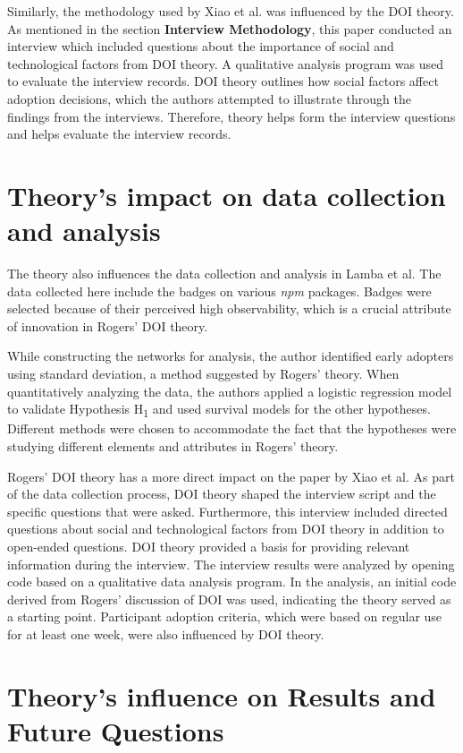 \documentclass[journal,12pt,onecolumn,]{IEEEtran}
\begin{document}
Similarly, the methodology used by Xiao et al. was influenced by the DOI theory. As mentioned in the section \textbf{Interview Methodology}, this paper conducted an interview which included questions about the importance of social and technological factors from DOI theory.
A qualitative analysis program was used to evaluate the interview records. DOI theory outlines how social factors affect adoption decisions, which the authors attempted to illustrate through the findings from the interviews. Therefore, theory helps form the interview questions and helps evaluate the interview records.
\section{Theory's impact on data collection and analysis}
The theory also influences the data collection and analysis in Lamba et al. The data collected here include the badges on various \textit{npm} packages. Badges were selected because of their perceived high observability, which is a crucial attribute of innovation in Rogers' DOI theory.

While constructing the networks for analysis, the author identified early adopters using standard deviation, a method suggested by Rogers' theory.
When quantitatively analyzing the data, the authors applied a logistic regression model to validate Hypothesis H\textsubscript{1} and used survival models for the other hypotheses. Different methods were chosen to accommodate the fact that the hypotheses were studying different elements and attributes in Rogers' theory.

Rogers' DOI theory has a more direct impact on the paper by Xiao et al. As part of the data collection process, DOI theory shaped the interview script and the specific questions that were asked. Furthermore, this interview included directed questions about social and technological factors from DOI theory in addition to open-ended questions.
DOI theory provided a basis for providing relevant information during the interview. The interview results were analyzed by opening code based on a qualitative data analysis program. In the analysis, an initial code derived from Rogers' discussion of DOI was used, indicating the theory served as a starting point.
Participant adoption criteria, which were based on regular use for at least one week, were also influenced by DOI theory.

\section{Theory's influence on Results and Future Questions}
\end{document}
